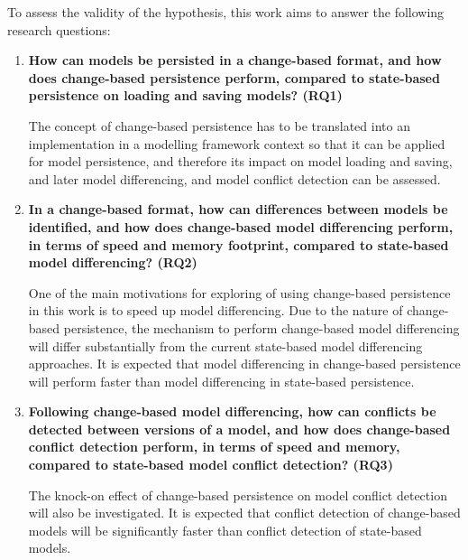 To assess the validity of the hypothesis, this work aims to answer the following research questions: 
\begin{enumerate} 
\item \textbf{How can models be persisted in a change-based format, and how does change-based persistence perform, compared to state-based persistence on loading and saving models? (RQ1)} 

The concept of change-based persistence has to be translated into an implementation in a modelling framework context so that it can be applied for model persistence, and therefore its impact on model loading and saving, and later model differencing, and model conflict detection can be assessed.

\item \textbf{In a change-based format, how can differences between models be identified, and how does change-based model differencing perform, in terms of speed and memory footprint, compared to state-based model differencing? (RQ2)} 

One of the main motivations for exploring of using change-based persistence in this work is to speed up model differencing. Due to the nature of change-based persistence, the mechanism to perform change-based model differencing will differ substantially from the current state-based model differencing approaches. It is expected that model differencing in change-based persistence will perform faster than model differencing in state-based persistence.        

\item \textbf{Following change-based model differencing, how can conflicts be detected between versions of a model, and  how does change-based conflict detection perform, in terms of speed and memory, compared to state-based model conflict detection? (RQ3)} 

The knock-on effect of change-based persistence on model conflict detection will also be investigated. It is expected that conflict detection of change-based models will be significantly faster than conflict detection of state-based models.

\end{enumerate}

